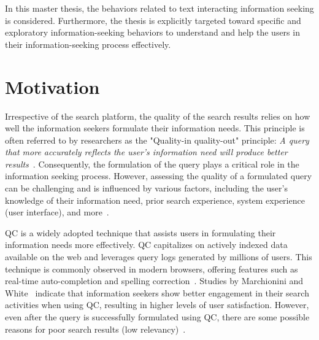 In this master thesis, the behaviors related to text interacting information seeking is considered. Furthermore, the thesis is explicitly targeted toward specific and exploratory information-seeking behaviors to understand and help the users in their information-seeking process effectively.

\section{Motivation}

Irrespective of the search platform, the quality of the search results relies on how well the information seekers formulate their information needs. This principle is often referred to by researchers as the "Quality-in quality-out" principle: \textit{A query that more accurately reflects the user's information need will produce better results}~\cite{croft1987i3r}. Consequently, the formulation of the query plays a critical role in the information seeking process. However, assessing the quality of a formulated query can be challenging and is influenced by various factors, including the user's knowledge of their information need, prior search experience, system experience (user interface), and more~\cite{marchionini2007find}.

 \ac{QC} is a widely adopted technique that assists users in formulating their information needs more effectively. \ac{QC} capitalizes on actively indexed data available on the web and leverages query logs generated by millions of users. This technique is commonly observed in modern browsers, offering features such as real-time auto-completion and spelling correction~\cite{bast2006type, gaizauskas1998information}. Studies by Marchionini and White~\cite{marchionini2007find} indicate that information seekers show better engagement in their search activities when using \ac{QC}, resulting in higher levels of user satisfaction. However, even after the query is successfully formulated using \ac{QC}, there are some possible reasons for poor search results (low relevancy)~\cite{azad2019query}. 

